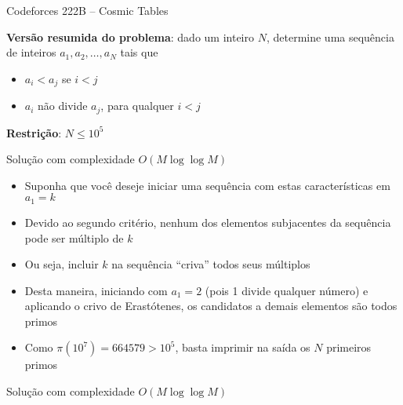 \begin{frame}[fragile]{Codeforces 222B -- Cosmic Tables}

    \textbf{Versão resumida do problema}: dado um inteiro $N$, determine uma sequência de inteiros
        $a_1, a_2, \ldots, a_N$ tais que

    \begin{itemize}
        \item $a_i < a_j$ se $i < j$
        \item $a_i$ não divide $a_j$, para qualquer $i < j$
    \end{itemize}

    \vspace{0.1in}
    \textbf{Restrição}: $N \leq 10^5$

\end{frame}

\begin{frame}[fragile]{Solução com complexidade $O(M\log \log M)$}

    \begin{itemize}
        \item Suponha que você deseje iniciar uma sequência com estas características em $a_1 = k$

        \item Devido ao segundo critério, nenhum dos elementos subjacentes da sequência pode ser 
            múltiplo de $k$

        \item Ou seja, incluir $k$ na sequência ``criva'' todos seus múltiplos

        \item Desta maneira, iniciando com $a_1 = 2$ (pois 1 divide qualquer número) e aplicando
            o crivo de Erastótenes, os candidatos a demais elementos são todos primos

        \item Como $\pi(10^7) = 664579 > 10^5$, basta imprimir na saída os $N$ primeiros primos
    \end{itemize}

\end{frame}

\begin{frame}[fragile]{Solução com complexidade $O(M\log \log M)$}
\end{frame}
